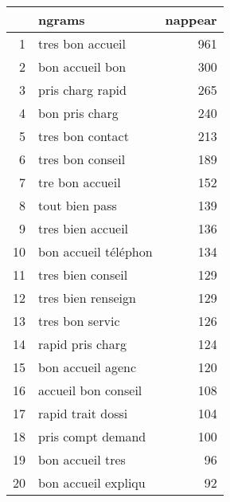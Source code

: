 \begin{tabular}{|r|l|r|}
  \hline
 & ngrams & nappear \\ 
  \hline
1 & tres bon accueil & 961 \\ 
  2 & bon accueil bon & 300 \\ 
  3 & pris charg rapid & 265 \\ 
  4 & bon pris charg & 240 \\ 
  5 & tres bon contact & 213 \\ 
  6 & tres bon conseil & 189 \\ 
  7 & tre bon accueil & 152 \\ 
  8 & tout bien pass & 139 \\ 
  9 & tres bien accueil & 136 \\ 
  10 & bon accueil téléphon & 134 \\ 
  11 & tres bien conseil & 129 \\ 
  12 & tres bien renseign & 129 \\ 
  13 & tres bon servic & 126 \\ 
  14 & rapid pris charg & 124 \\ 
  15 & bon accueil agenc & 120 \\ 
  16 & accueil bon conseil & 108 \\ 
  17 & rapid trait dossi & 104 \\ 
  18 & pris compt demand & 100 \\ 
  19 & bon accueil tres &  96 \\ 
  20 & bon accueil expliqu &  92 \\ 
   \hline
\end{tabular}
